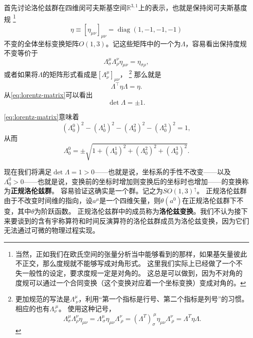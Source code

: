 \documentclass[hyperref, UTF8, a4paper]{ctexart}
\DeclareMathOperator{\diag}{diag}
\newcommand*{\reals}{\mathbb{R}}
\begin{document}
首先讨论洛伦兹群在四维闵可夫斯基空间$\reals^{3, 1}$上的表示，也就是保持闵可夫斯基度规%
\footnote{当然，正如我们在欧氏空间的张量分析当中能够看到的那样，如果基矢量彼此不正交，那么度规就不能够写成对角形式。
这里我们实际上已经做了一个不失一般性的设定，要求度规一定是对角的。
这总是可以做到，因为不对角的度规可以通过一个合同变换（这个变换对应着一个坐标变换）变成对角的。}%
\begin{equation}
    \eta \equiv [\eta_{\mu \nu}]_{\mu \nu} = \diag (1, -1, -1, -1)
\end{equation}
不变的全体坐标变换矩阵$O(1,3)$。记这些矩阵中的一个为$\Lambda$，容易看出保持度规不变等价于
\begin{equation}
    \Lambda_\sigma^\mu \Lambda_\rho^\nu \eta_{\mu \nu} = \eta_{\sigma \rho},
\end{equation}
或者如果将$\Lambda$的矩阵形式看成是$[\Lambda^\mu_\nu]_{\mu \nu}$，%
\footnote{更加规范的写法是$\Lambda^\mu_{\ \nu}$，利用“第一个指标是行号、第二个指标是列号”的习惯。相应的也有$\Lambda_{\nu}^{\ \mu}$。
使用这种记号，
\[
    \Lambda_\sigma^\mu \Lambda_\rho^\nu \eta_{\mu \nu} = \Lambda_{\ \sigma}^\mu \eta_{\mu \nu} \Lambda_{\ \rho}^\nu = (\Lambda^T)_\sigma^{\ \mu} \eta_{\mu \nu} \Lambda_{\ \rho}^\nu = \Lambda^T \eta \Lambda.
\]
}%
那么就是
\begin{equation}
    \Lambda^\top \eta \Lambda = \eta.
    \label{eq:lorentz-matrix}
\end{equation}
从\eqref{eq:lorentz-matrix}可以看出
\begin{equation}
    \det \Lambda = \pm 1. 
    \label{eq:det-lorentz}
\end{equation}

\eqref{eq:lorentz-matrix}意味着
\[
    (\Lambda_0^0)^2 - (\Lambda_0^1)^2 - (\Lambda_0^2)^2 - (\Lambda_0^3)^2 = 1,
\]
从而
\begin{equation}
    \Lambda_0^0 = \pm \sqrt{1 + (\Lambda_0^1)^2 + (\Lambda_0^2)^2 + (\Lambda_0^3)^2}.
\end{equation}

现在我们将满足$\det \Lambda = 1 > 0$——也就是说，坐标系的手性不改变——以及$\Lambda_0^0 > 0$——也就是说，变换前的坐标时增加则变换后的坐标时也增加——的变换称为\textbf{正规洛伦兹群}。
容易验证这确实是一个群。记之为$SO(1,3)^\uparrow$。
正规洛伦兹群由于不改变时间维的指向，设$a^\mu$是一个四维矢量，则$\theta(a^0)$在正规洛伦兹群下不变，其中$\theta$为阶跃函数。
正规洛伦兹群中的成员称为\textbf{洛伦兹变换}。我们不认为接下来要谈到的含有宇称算符和时间反演算符的洛伦兹群成员为洛伦兹变换，因为它们无法通过可微的物理过程实现。
\end{document}
